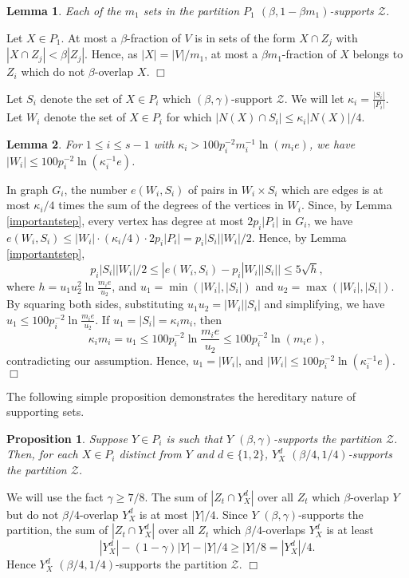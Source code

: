 \documentclass[11pt]{article}
\newtheorem{lemma}{Lemma}[section]
\newtheorem{proposition}{Proposition}[section]
\newenvironment{proof}
      {\medskip\noindent{\bf Proof:}\hspace{1mm}}
      {\hfill$\Box$\medskip}
\begin{document}
\begin{lemma}\label{claimfirstpart}
Each of the $m_1$ sets in the partition $P_1$ $(\beta,1-\beta m_1)$-supports
$\mathcal{Z}$.
\end{lemma}
\begin{proof}
Let $X \in P_1$. At most a $\beta$-fraction of $V$ is in sets of the form $X
\cap Z_j$ with $|X \cap Z_j| < \beta |Z_j|$. Hence, as $|X| = |V|/m_1$, at most
a $\beta m_1$-fraction of $X$ belongs to $Z_i$ which do not $\beta$-overlap
$X$.
\end{proof}

Let $S_i$ denote the set of $X \in P_i$ which $(\beta,\gamma)$-support
$\mathcal{Z}$. We will let $\kappa_i=\frac{|S_i|}{|P_i|}$. Let $W_i$ denote the
set of $X \in P_i$ for which  $|N(X) \cap S_i| \leq \kappa_i|N(X)|/4$.

\begin{lemma}\label{Wibound}
For $1 \leq i \leq s-1$ with $\kappa_i > 100p_i^{-2}m_i^{-1}\ln (m_ie)$, we
have $|W_i| \leq 100p_i^{-2}\ln (\kappa_i^{-1}e)$.
\end{lemma}
\begin{proof}
In graph $G_i$, the number $e(W_i,S_i)$ of pairs in $W_i \times S_i$ which are
edges is at most $\kappa_i/4$ times the sum of the degrees of the vertices in
$W_i$. Since, by Lemma \ref{importantstep}, every vertex has degree at most
$2p_i|P_i|$ in $G_i$, we have
$e(W_i,S_i) \leq |W_i|\cdot (\kappa_i/4) \cdot 2p_i|P_i|=p_i|S_i||W_i|/2$.
Hence, by Lemma \ref{importantstep},
$$p_i|S_i||W_i|/2 \leq |e(W_i,S_i)-p_i|W_i||S_i|| \leq 5\sqrt{h},$$
where $h=u_1u_2^2\ln \frac{m_i e}{u_2}$, and $u_1=\min (|W_i|,|S_i|)$ and
$u_2=\max(|W_i|,|S_i|)$. By squaring both sides, substituting
$u_1u_2=|W_i||S_i|$ and simplifying, we have $u_1
\leq 100p_i^{-2}\ln \frac{m_ie}{u_2}$. If $u_1=|S_i|=\kappa_im_i$, then
$$\kappa_im_i=u_1 \leq 100p_i^{-2}\ln \frac{m_ie}{u_2} \leq 100p_i^{-2} \ln
(m_ie),$$ contradicting our assumption. Hence,
$u_1=|W_i|$, and $|W_i| \leq 100p_i^{-2}\ln (\kappa_i^{-1}e)$.
 \end{proof}

The following simple proposition demonstrates the hereditary nature of
supporting sets.

\begin{proposition}\label{firstpropherabc}
Suppose $Y \in P_i$ is such that $Y$ $(\beta,\gamma)$-supports the partition
$\mathcal{Z}$. Then, for each $X \in P_i$ distinct from $Y$ and $d \in
\{1,2\}$, $Y^d_X$ $(\beta/4,1/4)$-supports the partition
$\mathcal{Z}$.
\end{proposition}
\begin{proof}
We will use the fact $\gamma \geq 7/8$. The sum of $|Z_t \cap Y_X^d|$ over all
$Z_t$ which $\beta$-overlap $Y$ but do not $\beta/4$-overlap $Y_X^d$ is at most
$|Y|/4$. Since $Y$ $(\beta,\gamma)$-supports the partition, the sum of $|Z_t
\cap Y^d_X|$ over all $Z_t$ which $\beta/4$-overlaps $Y^d_X$ is at least
$$|Y_X^d|-(1-\gamma)|Y|-|Y|/4 \geq |Y|/8=|Y_X^d|/4.$$
Hence $Y^d_X$ $(\beta/4,1/4)$-supports the partition $\mathcal{Z}$.
\end{proof}
\end{document}
